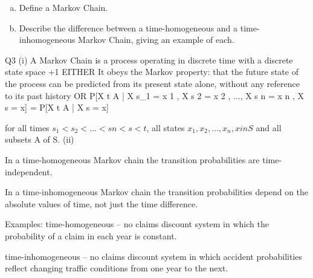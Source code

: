 \documentclass[a4paper,12pt]{article}
\begin{document}
\begin{enumerate}[(a)]
\item Define a Markov Chain.
\item Describe the difference between a time-homogeneous and a time-inhomogeneous Markov Chain, giving an example of each.
\end{enumerate}

\newpage

Q3
(i)
A Markov Chain is a process operating in discrete time with a discrete state
space
+1
EITHER
It obeys the Markov property: 
that the future state of the process can be predicted from its present
state alone, without any reference to its past history 
OR
P[X t \in A | X s_1 = x 1 , X s 2 = x 2 , ..., X s n = x n , X s = x] = P[X t \in A | X s = x]

for all times $s_1 < s_2 < ... < sn < s < t$, all states $x_1 , x_2 , \ldots, x_n , x in S$ and
all subsets A of S.
(ii)


In a time-homogeneous Markov chain the transition probabilities are time-
independent.

In a time-inhomogeneous Markov chain the transition probabilities depend on
the absolute values of time, not just the time difference.

Examples: time-homogeneous – no claims discount system in which the
probability of a claim in each year is constant.

time-inhomogeneous – no claims discount system in which accident
probabilities reflect changing traffic conditions from one year to the next. 

\end{document}
